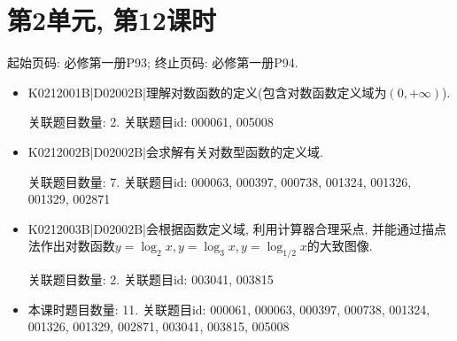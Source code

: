 \section*{第2单元, 第12课时}
起始页码: 必修第一册P93; 终止页码: 必修第一册P94.
\begin{itemize}
\item K0212001B|D02002B|理解对数函数的定义(包含对数函数定义域为$(0,+\infty)$).

关联题目数量: 2. 关联题目id: 000061, 005008

\item K0212002B|D02002B|会求解有关对数型函数的定义域.

关联题目数量: 7. 关联题目id: 000063, 000397, 000738, 001324, 001326, 001329, 002871

\item K0212003B|D02002B|会根据函数定义域, 利用计算器合理采点, 并能通过描点法作出对数函数$y=\log_2x,y=\log_3x,y=\log_{1/2}x$的大致图像.

关联题目数量: 2. 关联题目id: 003041, 003815

\item 本课时题目数量: 11. 关联题目id: 000061, 000063, 000397, 000738, 001324, 001326, 001329, 002871, 003041, 003815, 005008

\end{itemize}

